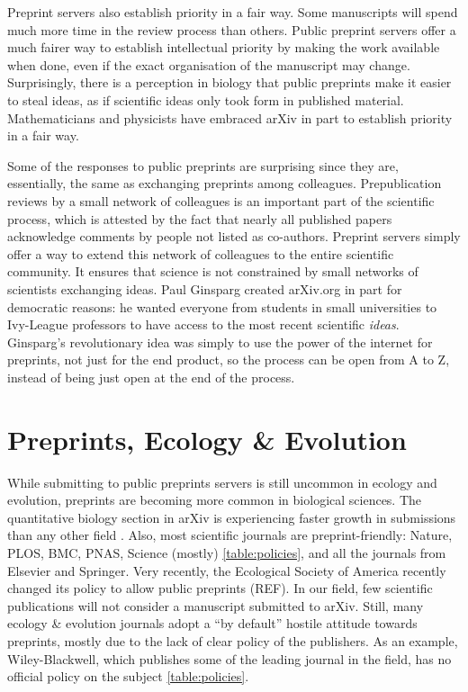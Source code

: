 \documentclass[letterpaper,twocolumn,superscriptaddress,showkeys]{revtex4}
\begin{document}
Preprint servers also establish priority in a fair way.  Some manuscripts will
spend much more time in the review process than others.  Public preprint servers
offer a much fairer way to establish intellectual priority by making the work
available when done, even if the exact organisation of the manuscript may
change. Surprisingly, there is a perception in biology that public preprints
make it easier to steal ideas, as if scientific ideas only took form in
published material.  Mathematicians and physicists have embraced arXiv in part
to establish priority in a fair way\cite{cal12}.

Some of the responses to public preprints are surprising since they are,
essentially, the same as exchanging preprints among colleagues.  Prepublication
reviews by a small network of colleagues is an important part of the scientific
process, which is attested by the fact that nearly all published papers
acknowledge comments by people not listed as co-authors.  Preprint servers
simply offer a way to extend this network of colleagues to the entire scientific
community. It ensures that science is not constrained by small networks of
scientists exchanging ideas.  Paul Ginsparg created arXiv.org in part for
democratic reasons: he wanted everyone from students in small universities to
Ivy-League professors to have access to the most recent scientific \emph{ideas}.
Ginsparg's revolutionary idea was simply to use the power of the internet for
preprints, not just for the end product, so the process can be open from A to Z,
instead of being just open at the end of the process.

\section{Preprints, Ecology \& Evolution}

While submitting to public preprints servers is still uncommon in ecology and
evolution, preprints are becoming more common in biological sciences. The
quantitative biology section in arXiv is experiencing faster growth in
submissions than any other field \cite{cal12}. Also, most scientific journals
are preprint-friendly: Nature, PLOS, BMC, PNAS, Science (mostly)
\ref{table:policies}, and all the journals from Elsevier and Springer. Very
recently, the Ecological Society of America recently changed its policy to allow
public preprints (REF). In our field, few scientific publications will not
consider a manuscript submitted to arXiv.  Still, many ecology \& evolution
journals adopt a ``by default'' hostile attitude towards preprints, mostly due
to the lack of clear policy of the publishers. As an example, Wiley-Blackwell,
which publishes some of the leading journal in the field, has no official policy
on the subject \ref{table:policies}.
\end{document}
